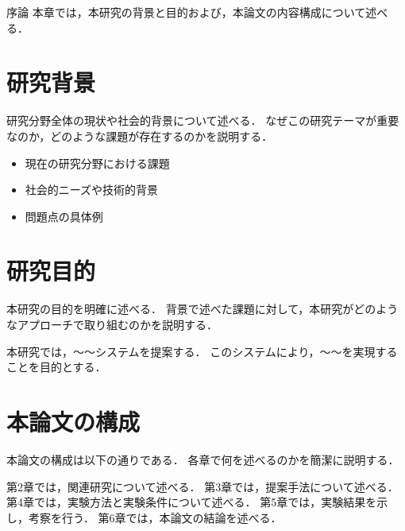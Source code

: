 \chapterhead
{序論}
{本章では，本研究の背景と目的および，本論文の内容構成について述べる．}



\section{研究背景}
研究分野全体の現状や社会的背景について述べる．
なぜこの研究テーマが重要なのか，どのような課題が存在するのかを説明する．


\begin{itemize}
  \item 現在の研究分野における課題
  \item 社会的ニーズや技術的背景
  \item 問題点の具体例
\end{itemize}

\newpage

\section{研究目的}
本研究の目的を明確に述べる．
背景で述べた課題に対して，本研究がどのようなアプローチで取り組むのかを説明する．

本研究では，〜〜システムを提案する．
このシステムにより，〜〜を実現することを目的とする．

\newpage

\section{本論文の構成}
本論文の構成は以下の通りである．
各章で何を述べるのかを簡潔に説明する．

第2章では，関連研究について述べる．
第3章では，提案手法について述べる．
第4章では，実験方法と実験条件について述べる．
第5章では，実験結果を示し，考察を行う．
第6章では，本論文の結論を述べる．
\newpage